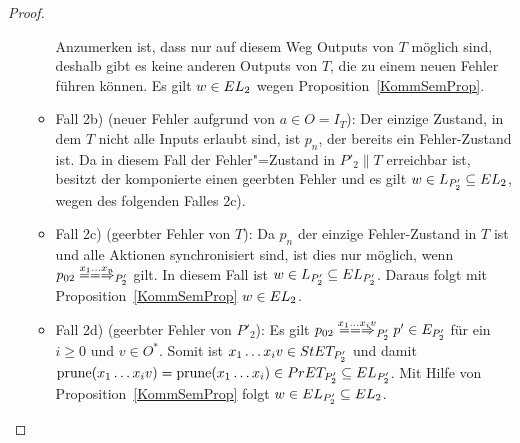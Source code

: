 \begin{proof}
\begin{itemize}
\begin{itemize}
          Anzumerken ist, dass nur auf diesem Weg Outputs von $T$ möglich sind,
          deshalb gibt es keine anderen Outputs von $T$, die zu einem neuen
          Fehler führen können. Es gilt $w\in EL _2$ wegen
          Proposition~\ref{KommSemProp}.
        \item Fall 2b) (neuer Fehler aufgrund von $a\in O=I_T$): Der einzige
          Zustand, in dem $T$ nicht alle Inputs erlaubt sind, ist $p_n$, der
          bereits ein Fehler-Zustand ist. Da in diesem Fall der Fehler"=Zustand
          in $P'_2\|T$ erreichbar ist, besitzt der komponierte \MEIO{} einen
          geerbten Fehler und es gilt $w\in L_{P'_2}\subseteq EL _2$, wegen
          des folgenden Falles 2c).
        \item Fall 2c) (geerbter Fehler von $T$): Da $p_n$ der einzige
          Fehler-Zustand in $T$ ist und alle Aktionen synchronisiert sind, ist
          dies nur möglich, wenn $p_{02} \lweakmay[x_1\dots x_n]_{P'_2}$ gilt.
          In diesem Fall ist $w\in L_{P'_2}\subseteq EL _{P'_2}$. Daraus
          folgt mit Proposition~\ref{KommSemProp} $w\in EL _2$.
        \item Fall 2d) (geerbter Fehler von $P'_2$): Es gilt $p_{02}
          \lweakmay[x_1\dots x_iv]_{P'_2} p'\in E_{P'_2}$ für ein $i\geq 0$ und
          $v\in O^*$. Somit ist $x_1\dots x_i v\in StET _{P'_2}$ und damit
          $\mathrm{prune} (x_1\dots x_iv) =\mathrm{prune} (x_1\dots x_i)\in PrET
          _{P'_2}\subseteq EL _{P'_2}$. Mit Hilfe von
          Proposition~\ref{KommSemProp} folgt $w\in EL _{P'_2}\subseteq EL
          _2$.
      \end{itemize}
  \end{itemize}
\end{proof}

